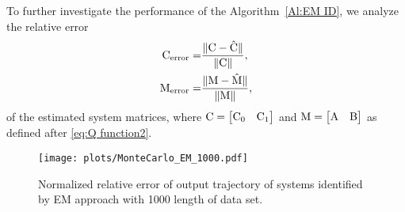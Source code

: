 

To further investigate the performance of the Algorithm~\ref{Al:EM ID}, we analyze the relative error 
\begin{equation}\label{eq: relative error parameters}
\begin{split}
    { \mathrm{C} }_{\text{error}} =&  \frac{\lVert { \mathrm{C} } - \hat{{ \mathrm{C} }} \rVert} {\lVert { \mathrm{C} } \rVert},\\
    { \mathrm{M} }_{\text{error}} =&  \frac{\lVert { \mathrm{M} } - \hat{{ \mathrm{M} }} \rVert} {\lVert { \mathrm{M} } \rVert},
\end{split}
\end{equation}
of the estimated system matrices, where ${ \mathrm{C} } = \begin{bmatrix}{ \mathrm{C} }_0 & { \mathrm{C} }_1 \end{bmatrix}$ and ${ \mathrm{M} } = \begin{bmatrix}{ \mathrm{A} } &{ \mathrm{B} } \end{bmatrix}$ as defined after \eqref{eq:Q function2}.
\begin{figure}[t!]
   \centering
   \texttt{[image: plots/MonteCarlo\_EM\_1000.pdf]}
   \caption{Normalized relative error of output trajectory of systems identified by EM approach with 1000 length of data set.}
   \label{img:EM_1000}
\end{figure}



